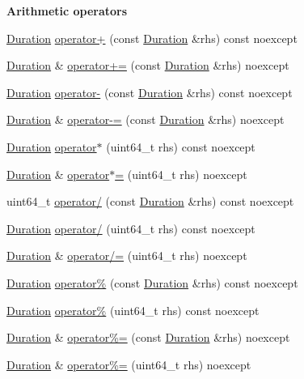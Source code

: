 \begin{Indent}\textbf{ Arithmetic operators}\par
\begin{DoxyCompactItemize}
\item 
\hyperlink{classfranka_1_1Duration}{Duration} \hyperlink{classfranka_1_1Duration_adb459e7bf5c6b02f9e72c808f5f30237}{operator+} (const \hyperlink{classfranka_1_1Duration}{Duration} \&rhs) const noexcept
\item 
\hyperlink{classfranka_1_1Duration}{Duration} \& \hyperlink{classfranka_1_1Duration_a9ba66e248b6ad33bb51f43cdcfe98479}{operator+=} (const \hyperlink{classfranka_1_1Duration}{Duration} \&rhs) noexcept
\item 
\hyperlink{classfranka_1_1Duration}{Duration} \hyperlink{classfranka_1_1Duration_a2a3bc1a8278b91bebe88d7498d410de9}{operator-\/} (const \hyperlink{classfranka_1_1Duration}{Duration} \&rhs) const noexcept
\item 
\hyperlink{classfranka_1_1Duration}{Duration} \& \hyperlink{classfranka_1_1Duration_a01e7024d77d75989b389515fdc33db15}{operator-\/=} (const \hyperlink{classfranka_1_1Duration}{Duration} \&rhs) noexcept
\item 
\hyperlink{classfranka_1_1Duration}{Duration} \hyperlink{classfranka_1_1Duration_a3eebc39550880fb2d23d45ba34d8acc5}{operator$\ast$} (uint64\+\_\+t rhs) const noexcept
\item 
\hyperlink{classfranka_1_1Duration}{Duration} \& \hyperlink{classfranka_1_1Duration_a0cfaeaa7e3c5b2de334a79732c24cd54}{operator$\ast$=} (uint64\+\_\+t rhs) noexcept
\item 
uint64\+\_\+t \hyperlink{classfranka_1_1Duration_a90c76be31b53e11f5761416a05d990be}{operator/} (const \hyperlink{classfranka_1_1Duration}{Duration} \&rhs) const noexcept
\item 
\hyperlink{classfranka_1_1Duration}{Duration} \hyperlink{classfranka_1_1Duration_a15b7299198f36734b62ac98da1ef8c9c}{operator/} (uint64\+\_\+t rhs) const noexcept
\item 
\hyperlink{classfranka_1_1Duration}{Duration} \& \hyperlink{classfranka_1_1Duration_a827f1d0177d06f51c55e56f540db02f8}{operator/=} (uint64\+\_\+t rhs) noexcept
\item 
\hyperlink{classfranka_1_1Duration}{Duration} \hyperlink{classfranka_1_1Duration_a5e472345c1bec29b645bee938932fdb1}{operator\%} (const \hyperlink{classfranka_1_1Duration}{Duration} \&rhs) const noexcept
\item 
\hyperlink{classfranka_1_1Duration}{Duration} \hyperlink{classfranka_1_1Duration_af06ff91f24d881c479768c1bcbf31a1e}{operator\%} (uint64\+\_\+t rhs) const noexcept
\item 
\hyperlink{classfranka_1_1Duration}{Duration} \& \hyperlink{classfranka_1_1Duration_aed73021c4abece659dd184b95ee27c90}{operator\%=} (const \hyperlink{classfranka_1_1Duration}{Duration} \&rhs) noexcept
\item 
\hyperlink{classfranka_1_1Duration}{Duration} \& \hyperlink{classfranka_1_1Duration_aa917a142ad452b02fd66fbdda63ac99d}{operator\%=} (uint64\+\_\+t rhs) noexcept
\end{DoxyCompactItemize}
\end{Indent}
